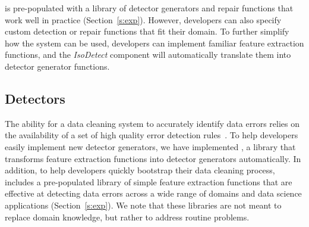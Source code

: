 \sys is pre-populated with a library of detector generators and repair functions that work well in practice (Section~\ref{s:exp}).  However,  developers can also specify custom detection or repair functions that fit their domain.  To further simplify how the system can be used, developers can implement familiar feature extraction functions, and the {\it IsoDetect} component will automatically translate them into detector generator functions.

\subsection{Detectors}

The ability for a data cleaning system to accurately identify data errors relies on the availability of a set of high quality error detection rules~\cite{DBLP:conf/sigmod/ChuIKW16}.  To help developers easily implement new detector generators, we have implemented \detectlib, a library that transforms feature extraction functions into detector generators automatically.  In addition, to help developers quickly bootstrap their data cleaning process, \sys includes a pre-populated library of simple feature extraction functions that are effective at detecting data errors across a wide range of domains and data science applications (Section~\ref{s:exp}).  We note that these libraries are not meant to replace domain knowledge, but rather to address routine problems.


